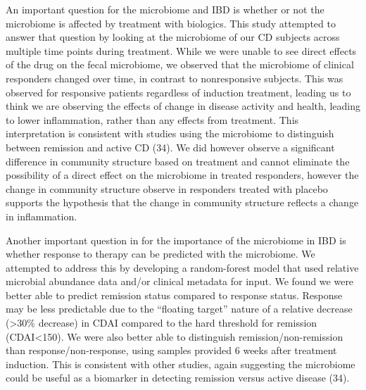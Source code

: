 \documentclass[11pt,]{article}
\begin{document}
An important question for the microbiome and IBD is whether or not the
microbiome is affected by treatment with biologics. This study attempted
to answer that question by looking at the microbiome of our CD subjects
across multiple time points during treatment. While we were unable to
see direct effects of the drug on the fecal microbiome, we observed that
the microbiome of clinical responders changed over time, in contrast to
nonresponsive subjects. This was observed for responsive patients
regardless of induction treatment, leading us to think we are observing
the effects of change in disease activity and health, leading to lower
inflammation, rather than any effects from treatment. This
interpretation is consistent with studies using the microbiome to
distinguish between remission and active CD (34). We did however observe
a significant difference in community structure based on treatment and
cannot eliminate the possibility of a direct effect on the microbiome in
treated responders, however the change in community structure observe in
responders treated with placebo supports the hypothesis that the change
in community structure reflects a change in inflammation.

Another important question in for the importance of the microbiome in
IBD is whether response to therapy can be predicted with the microbiome.
We attempted to address this by developing a random-forest model that
used relative microbial abundance data and/or clinical metadata for
input. We found we were better able to predict remission status compared
to response status. Response may be less predictable due to the
``floating target'' nature of a relative decrease (\textgreater{}30\%
decrease) in CDAI compared to the hard threshold for remission
(CDAI\textless{}150). We were also better able to distinguish
remission/non-remission than response/non-response, using samples
provided 6 weeks after treatment induction. This is consistent with
other studies, again suggesting the microbiome could be useful as a
biomarker in detecting remission versus active disease (34).
\end{document}
